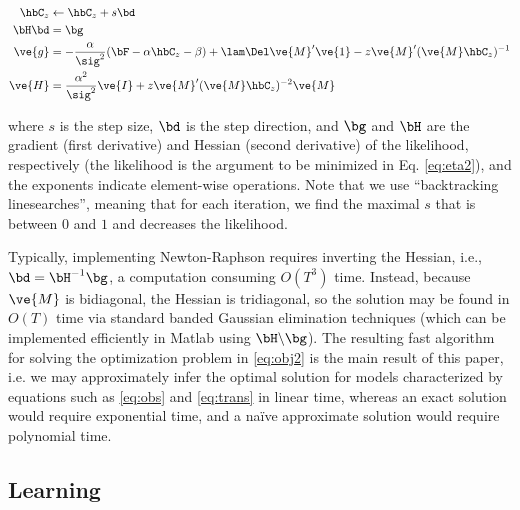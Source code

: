 
\begin{subequations} \label{eq:NR}
\begin{align}
\hbC_{\zzz} &\leftarrow \hbC_{\zzz} + s \bd \\
\bH \bd &= \bg \\
\ve{g} &= -\frac{\alpha}{\sig^2}(\bF -\alpha \hbC_{\zzz} - \beta) + \lam \Del \ve{M}' \ve{1} - \zzz \ve{M}' (\ve{M} \hbC_{\zzz})^{-1} \label{eq:g} \\
\ve{H} &= \frac{\alpha^2}{\sig^2} \ve{I} + \zzz \ve{M}' (\ve{M} \hbC_{\zzz})^{-2} \ve{M} \label{eq:H}
\end{align}
\end{subequations}

\noindent where $s$ is the step size, $\bd$ is the step direction, and $\bg$ and $\bH$ are the gradient (first derivative) and Hessian (second derivative) of the likelihood, respectively (the likelihood is the argument to be minimized in Eq. \eqref{eq:eta2}), and the exponents indicate element-wise operations. Note that we use ``backtracking linesearches'', meaning that for each iteration, we find the maximal $s$ that is between $0$ and $1$ and decreases the likelihood.

Typically, implementing Newton-Raphson requires inverting the Hessian, i.e., $\bd = \bH^{-1} \bg$, a computation consuming $O(T^3)$ time. Instead, because $\ve{M}$ is bidiagonal, the Hessian is tridiagonal, so the solution may be found in $O(T)$ time via standard banded Gaussian elimination techniques (which can be implemented efficiently in Matlab using $\bH \backslash \bg$). The resulting fast algorithm for solving the optimization problem in \eqref{eq:obj2} is the main result of this paper, i.e.  we may approximately infer the optimal solution  for models characterized by equations such as \eqref{eq:obs} and \eqref{eq:trans} in linear time, whereas an exact solution would require exponential time, and a na\"{i}ve approximate solution would require polynomial time.  


\subsection{Learning} \label{sec:est}

